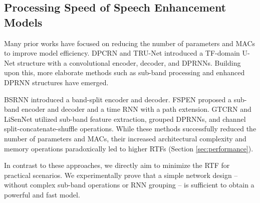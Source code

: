 \subsection{Processing Speed of Speech Enhancement Models}
\label{sec:related-speed}
Many prior works have focused on reducing the number of parameters and MACs to improve model efficiency. DPCRN \cite{dpcrn} and TRU-Net \cite{trunet} introduced a TF-domain U-Net structure with a convolutional encoder, decoder, and DPRNNs. Building upon this, more elaborate methods such as sub-band processing and enhanced DPRNN structures have emerged.

BSRNN \cite{bsrnn-music-separation} introduced a band-split encoder and decoder. FSPEN \cite{fspen} proposed a sub-band encoder and decoder and a time RNN with a path extension. GTCRN \cite{gtcrn} and LiSenNet \cite{lisennet} utilized sub-band feature extraction, grouped DPRNNs, and channel split-concatenate-shuffle operations. While these methods successfully reduced the number of parameters and MACs, their increased architectural complexity and memory operations paradoxically led to higher RTFs (Section \ref{sec:performance}).

In contrast to these approaches, we directly aim to minimize the RTF for practical scenarios. We experimentally prove that a simple network design -- without complex sub-band operations or RNN grouping -- is sufficient to obtain a powerful and fast model.
